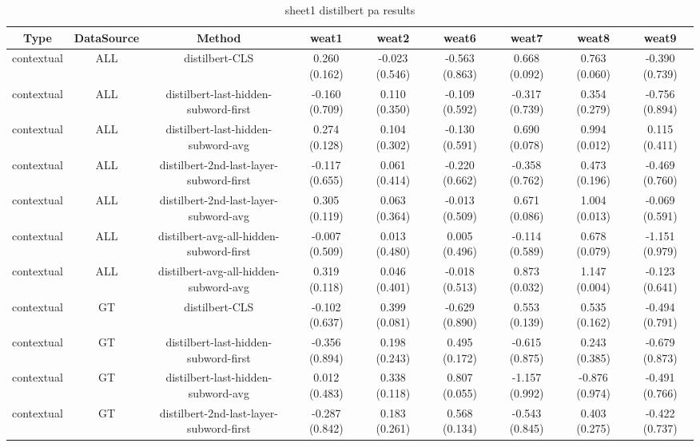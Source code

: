 \begin{sidewaystable}[htb]
    \centering
    \caption{sheet1 distilbert pa results}
    \label{appendix_tab:sheet1_distilbert_pa_results}
    \small
    \begin{tabular}{@{}ccccccccc@{}}
        \toprule
        Type & DataSource & Method & weat1 & weat2 & weat6 & weat7 & weat8 & weat9 \\
        \midrule
        contextual & ALL & distilbert-CLS & 0.260 (0.162) & -0.023 (0.546) & -0.563 (0.863) & 0.668 (0.092) & 0.763 (0.060) & -0.390 (0.739) \\
        contextual & ALL & distilbert-last-hidden-subword-first & -0.160 (0.709) & 0.110 (0.350) & -0.109 (0.592) & -0.317 (0.739) & 0.354 (0.279) & -0.756 (0.894) \\
        contextual & ALL & distilbert-last-hidden-subword-avg & 0.274 (0.128) & 0.104 (0.302) & -0.130 (0.591) & 0.690 (0.078) & 0.994 (0.012) & 0.115 (0.411) \\
        contextual & ALL & distilbert-2nd-last-layer-subword-first & -0.117 (0.655) & 0.061 (0.414) & -0.220 (0.662) & -0.358 (0.762) & 0.473 (0.196) & -0.469 (0.760) \\
        contextual & ALL & distilbert-2nd-last-layer-subword-avg & 0.305 (0.119) & 0.063 (0.364) & -0.013 (0.509) & 0.671 (0.086) & 1.004 (0.013) & -0.069 (0.591) \\
        contextual & ALL & distilbert-avg-all-hidden-subword-first & -0.007 (0.509) & 0.013 (0.480) & 0.005 (0.496) & -0.114 (0.589) & 0.678 (0.079) & -1.151 (0.979) \\
        contextual & ALL & distilbert-avg-all-hidden-subword-avg & 0.319 (0.118) & 0.046 (0.401) & -0.018 (0.513) & 0.873 (0.032) & 1.147 (0.004) & -0.123 (0.641) \\
        contextual & GT & distilbert-CLS & -0.102 (0.637) & 0.399 (0.081) & -0.629 (0.890) & 0.553 (0.139) & 0.535 (0.162) & -0.494 (0.791) \\
        contextual & GT & distilbert-last-hidden-subword-first & -0.356 (0.894) & 0.198 (0.243) & 0.495 (0.172) & -0.615 (0.875) & 0.243 (0.385) & -0.679 (0.873) \\
        contextual & GT & distilbert-last-hidden-subword-avg & 0.012 (0.483) & 0.338 (0.118) & 0.807 (0.055) & -1.157 (0.992) & -0.876 (0.974) & -0.491 (0.766) \\
        contextual & GT & distilbert-2nd-last-layer-subword-first & -0.287 (0.842) & 0.183 (0.261) & 0.568 (0.134) & -0.543 (0.845) & 0.403 (0.275) & -0.422 (0.737) \\

\end{tabular}
\end{sidewaystable}

